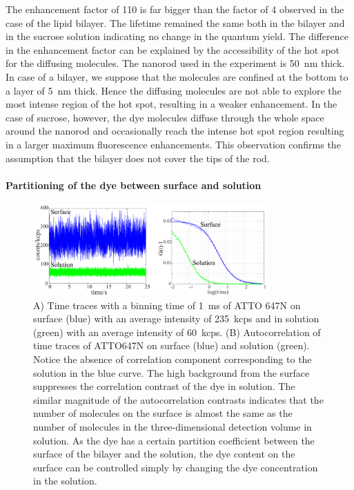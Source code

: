 The enhancement factor of 110 is far bigger than the factor of 4 observed in the case of the lipid bilayer. 
The lifetime remained the same both in the bilayer and in the sucrose solution indicating no change in the quantum yield.
The difference in the enhancement factor can be explained by the accessibility of the hot spot for the diffusing molecules.
The nanorod used in the experiment is \SI{50}{\nm} thick.
In case of a bilayer, we suppose that the molecules are confined at the bottom to a layer of \SI{5}{\nm} thick.
Hence the diffusing molecules are not able to explore the most intense region of the hot spot, resulting in a weaker enhancement.
In the case of sucrose, however, the dye molecules diffuse through the whole space around the nanorod and occasionally reach the intense hot spot region resulting in a larger maximum fluorescence enhancements.
This observation confirms the assumption that the bilayer does not cover the tips of the rod.
\paragraph*{Partitioning of the dye between surface and solution}
\begin{figure}%
  \centering
  \includegraphics[width=0.8\textwidth]{surf_soln}
  \makeatletter
  \renewcommand{\fnum@figure}{\figurename~S\thefigure}
  \makeatother{}
  \caption{A) Time traces with a binning time of \SI{1}{\ms} of ATTO 647N on surface (blue) with an average intensity of \SI{235}{ kcps} and in solution (green) with an average intensity of \SI{60}{ kcps}.
  (B) Autocorrelation of time traces of ATTO647N on surface (blue) and solution (green).
  Notice the absence of correlation component corresponding to the solution in the blue curve.
  The high background from the surface suppresses the correlation contrast of the dye in solution.
  The similar magnitude of the autocorrelation contrasts indicates that the number of molecules on the surface is almost the same as the number of molecules in the three-dimensional detection volume in solution.
  As the dye has a certain partition coefficient between the surface of the bilayer and the solution, the dye content on the surface can be controlled simply by changing the dye concentration in the solution.}
  \label{SIfig:surf-soln}
\end{figure}